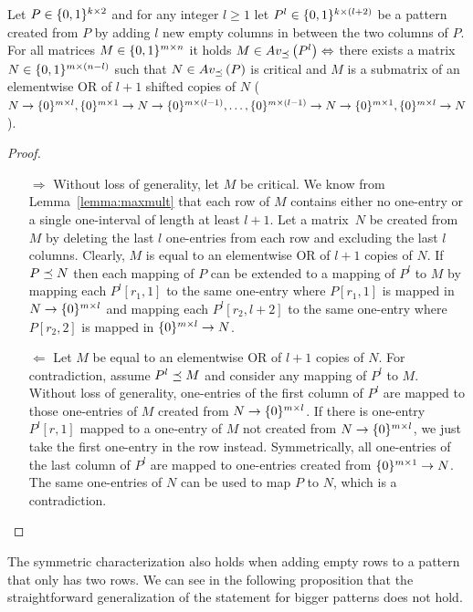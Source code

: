 \begin{thm}
\label{thm:emptymiddle}
Let $P\in\{0,1\}^{k\times2}$ and for any integer $l\geq1$ let $P^l\in\{0,1\}^{k\times(l+2)}$ be a pattern created from $P$ by adding $l$ new empty columns in between the two columns of $P$. For all matrices $M\in\{0,1\}^{m\times n}$ it holds $M\in Av_{\preceq}\left(P^l\right)\Leftrightarrow$ there exists a matrix $N\in\{0,1\}^{m\times(n-l)}$ such that $N\in Av_{\preceq}\left(P\right)$ is critical and $M$ is a submatrix of an elementwise OR of $l+1$ shifted copies of $N$ ($N\rightarrow\{0\}^{m\times l},\{0\}^{m\times 1}\rightarrow N\rightarrow\{0\}^{m\times(l-1)},\dots,\{0\}^{m\times(l-1)}\rightarrow N\rightarrow\{0\}^{m\times1},\{0\}^{m\times l}\rightarrow N$).
\end{thm}
\begin{proof}
\begin{itemize}
	\item[$\Rightarrow$] Without loss of generality, let $M$ be critical. We know from Lemma~\ref{lemma:maxmult} that each row of $M$ contains either no one-entry or a single one-interval of length at least $l+1$. Let a matrix~$N$ be created from $M$ by deleting the last $l$ one-entries from each row and excluding the last $l$ columns. Clearly, $M$ is equal to an elementwise OR of $l+1$ copies of $N$. If $P\preceq N$ then each mapping of $P$ can be extended to a mapping of $P^l$ to $M$ by mapping each $P^l[r_1,1]$ to the same one-entry where $P[r_1,1]$ is mapped in $N\rightarrow\{0\}^{m\times l}$ and mapping each $P^l[r_2,l+2]$ to the same one-entry where $P[r_2,2]$ is mapped in $\{0\}^{m\times l}\rightarrow N$.
	\item[$\Leftarrow$] Let $M$ be equal to an elementwise OR of $l+1$ copies of $N$. For contradiction, assume $P^l\preceq M$ and consider any mapping of $P^l$ to $M$. Without loss of generality, one-entries of the first column of $P^l$ are mapped to those one-entries of $M$ created from $N\rightarrow\{0\}^{m\times l}$. If there is one-entry $P^l[r,1]$ mapped to a one-entry of $M$ not created from $N\rightarrow\{0\}^{m\times l}$, we just take the first one-entry in the row instead. Symmetrically, all one-entries of the last column of $P^l$ are mapped to one-entries created from $\{0\}^{m\times1}\rightarrow N$. The same one-entries of $N$ can be used to map $P$ to $N$, which is a contradiction. \qedhere
\end{itemize}
\end{proof}

The symmetric characterization also holds when adding empty rows to a pattern that only has two rows. We can see in the following proposition that the straightforward generalization of the statement for bigger patterns does not hold.


